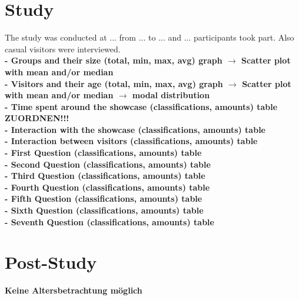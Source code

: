 
\section{Study}
\label{evaluation_study}

The study was conducted at ... from ... to ... and ... participants took part. Also casual visitors were interviewed.
\\
\textbf{- Groups and their size (total, min, max, avg) graph $\to$ Scatter plot with mean and/or median
\\
- Visitors and their age (total, min, max, avg) graph $\to$ Scatter plot with mean and/or median $\to$ modal distribution
\\
- Time spent around the showcase (classifications, amounts) table ZUORDNEN!!!
\\
- Interaction with the showcase (classifications, amounts) table
\\
- Interaction between visitors (classifications, amounts) table
\\
- First Question (classifications, amounts) table
\\
- Second Question (classifications, amounts) table
\\
- Third Question (classifications, amounts) table
\\
- Fourth Question (classifications, amounts) table
\\
- Fifth Question (classifications, amounts) table
\\
- Sixth Question (classifications, amounts) table
\\
- Seventh Question (classifications, amounts) table}
%


\section{Post-Study}
\label{evaluation_post}

\textbf{Keine Altersbetrachtung möglich}